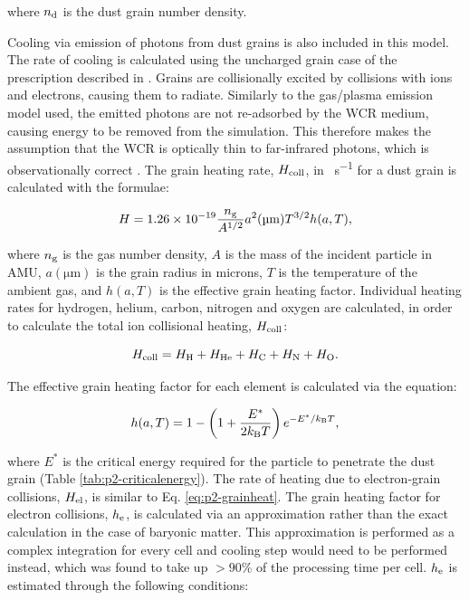 \noindent
where $n_\text{d}$ is the dust grain number density.

Cooling via emission of photons from dust grains is also included in this model.
The rate of cooling is calculated using the uncharged grain case of the prescription described in \textcite{dwek_infrared_1981}.
Grains are collisionally excited by collisions with ions and electrons, causing them to radiate.
Similarly to the gas/plasma emission model used, the emitted photons are not re-adsorbed by the WCR medium, causing energy to be removed from the simulation.
This therefore makes the assumption that the WCR is optically thin to far-infrared photons, which is observationally correct \parencite{monnierKeckAperturemaskingExperiment2007,soulainSPHEREViewWolfRayet2018,callinghamAnisotropicWindsWolf2019}.
The grain heating rate, $H_\text{coll}$, in \si{\erg\per\second} for a dust grain is calculated with the formulae:

\begin{equation}
  \label{eq:p2-grainheat}
  H = 1.26 \times 10^{-19} \frac{n_\text{g}}{A^{1/2}} a^2(\si{\micro\metre}) T^{3/2} h(a,T) , 
\end{equation}

\noindent
where $n_\text{g}$ is the gas number density,
$A$ is the mass of the incident particle in AMU,
$a(\si{\micro\metre})$ is the grain radius in microns,
$T$ is the temperature of the ambient gas,
and $h(a,T)$ is the effective grain heating factor.
Individual heating rates for hydrogen, helium, carbon, nitrogen and oxygen are calculated, in order to calculate the total ion collisional heating, $H_\text{coll}$:

\begin{equation}
  H_\text{coll} = H_\text{H} + H _\text{He} + H_\text{C} + H_\text{N} + H_\text{O} .
\end{equation}

\noindent
The effective grain heating factor for each element is calculated via the equation:

\begin{equation}
  h(a,T) = 1 - \left( 1 + \frac{E^*}{2 k_\text{B} T} \right) e^{- E^* / k_\text{B} T} ,
\end{equation}

\noindent
where $E^*$ is the critical energy required for the particle to penetrate the dust grain (Table \ref{tab:p2-criticalenergy}).
The rate of heating due to electron-grain collisions, $H_\text{el}$, is similar to Eq. \ref{eq:p2-grainheat}.
The grain heating factor for electron collisions, $h_\text{e}$, is calculated via an approximation rather than the exact calculation in the case of baryonic matter.
This approximation is performed as a complex integration for every cell and cooling step would need to be performed instead, which was found to take up $>90\%$ of the processing time per cell.
$h_\text{e}$ is estimated through the following conditions:

